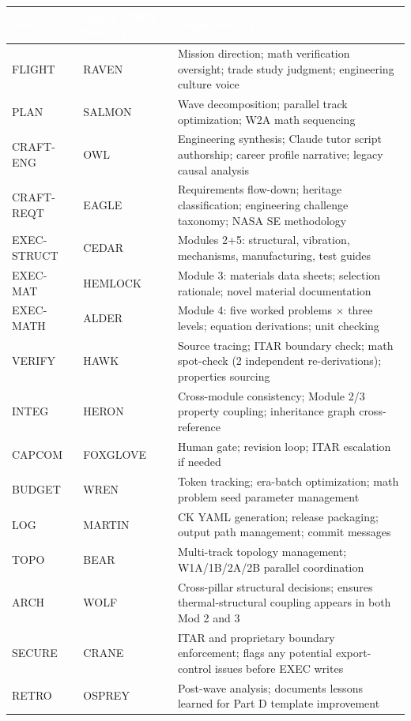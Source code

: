 \documentclass[11pt,letterpaper]{article}
\newcommand{\tableheader}[1]{\textbf{\sffamily\textcolor{white}{#1}}}
\begin{document}
\begin{center}
\begin{tabularx}{\textwidth}{L{2cm}L{3cm}X}
\toprule
{}
\tableheader{Role} & \tableheader{Agent (PNW Naming)} & \tableheader{Responsibility} \\
\midrule
FLIGHT & RAVEN & Mission direction; math verification oversight; trade study judgment; engineering culture voice \\
PLAN & SALMON & Wave decomposition; parallel track optimization; W2A math sequencing \\
CRAFT-ENG & OWL & Engineering synthesis; Claude tutor script authorship; career profile narrative; legacy causal analysis \\
CRAFT-REQT & EAGLE & Requirements flow-down; heritage classification; engineering challenge taxonomy; NASA SE methodology \\
EXEC-STRUCT & CEDAR & Modules 2+5: structural, vibration, mechanisms, manufacturing, test guides \\
EXEC-MAT & HEMLOCK & Module 3: materials data sheets; selection rationale; novel material documentation \\
EXEC-MATH & ALDER & Module 4: five worked problems $\times$ three levels; equation derivations; unit checking \\
VERIFY & HAWK & Source tracing; ITAR boundary check; math spot-check (2 independent re-derivations); properties sourcing \\
INTEG & HERON & Cross-module consistency; Module 2/3 property coupling; inheritance graph cross-reference \\
CAPCOM & FOXGLOVE & Human gate; revision loop; ITAR escalation if needed \\
BUDGET & WREN & Token tracking; era-batch optimization; math problem seed parameter management \\
LOG & MARTIN & CK YAML generation; release packaging; output path management; commit messages \\
TOPO & BEAR & Multi-track topology management; W1A/1B/2A/2B parallel coordination \\
ARCH & WOLF & Cross-pillar structural decisions; ensures thermal-structural coupling appears in both Mod 2 and 3 \\
SECURE & CRANE & ITAR and proprietary boundary enforcement; flags any potential export-control issues before EXEC writes \\
RETRO & OSPREY & Post-wave analysis; documents lessons learned for Part D template improvement \\
\bottomrule
\end{tabularx}
\end{center}
\end{document}
